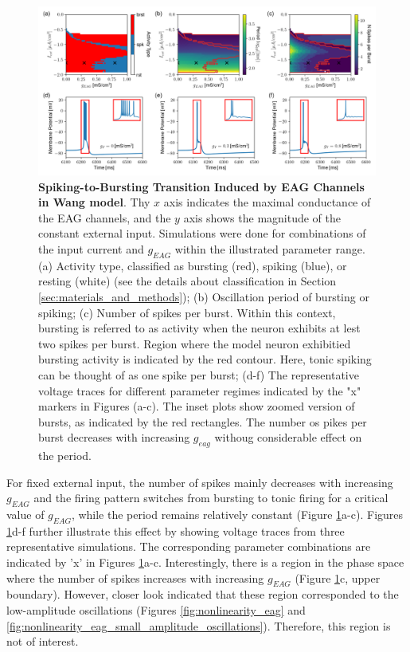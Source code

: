 \documentclass[../main.tex]{subfiles}
\begin{document}
\begin{figure}[!t]
    \centering
    \includegraphics[width=\linewidth]{../img/spiking_to_bursting/spiking_to_bursting.png}
    \caption[Spiking-to-Bursting Transition Induced by EAG Channels in Wang model]{
        \textbf{Spiking-to-Bursting Transition Induced by EAG Channels in Wang model}. 
        Thy $x$ axis indicates the maximal conductance of the EAG channels, and the $y$ axis shows the magnitude of the constant external input. Simulations were done for combinations of the input current and $g_{EAG}$ within the illustrated parameter range. (a) Activity type, classified as bursting (red), spiking (blue), or resting (white) (see the details about classification in Section \ref{sec:materials_and_methods}); (b) Oscillation period of bursting or spiking; (c) Number of spikes per burst. Within this context, bursting is referred to as activity when the neuron exhibits at lest two spikes per burst. Region where the model neuron exhibitied bursting activity is indicated by the red contour. Here, tonic spiking can be thought of as one spike per burst; (d-f) The representative voltage traces for different parameter regimes indicated by the "x" markers in Figures (a-c). The inset plots show zoomed version of bursts, as indicated by the red rectangles. The number os pikes per burst decreases with increasing $g_{eag}$ withoug considerable effect on the period.
    }
    \label{fig:spiking_to_bursting_wang_phase_diagram}
\end{figure}

For fixed external input, the number of spikes mainly decreases with increasing $g_{EAG}$ and the firing pattern switches from bursting to tonic firing for a critical value of $g_{EAG}$, while the period remains relatively constant (Figure \ref{fig:spiking_to_bursting_wang_phase_diagram}a-c).
Figures \ref{fig:spiking_to_bursting_wang_phase_diagram}d-f further illustrate this effect by showing voltage traces from three representative simulations. The corresponding parameter combinations are indicated by 'x' in Figures \ref{fig:spiking_to_bursting_wang_phase_diagram}a-c.
Interestingly, there is a region in the phase space where the number of spikes increases with increasing $g_{EAG}$ (Figure \ref{fig:spiking_to_bursting_wang_phase_diagram}c, upper boundary).
However, closer look indicated that these region corresponded to the low-amplitude oscillations (Figures \ref{fig:nonlinearity_eag} and \ref{fig:nonlinearity_eag_small_amplitude_oscillations}).
Therefore, this region is not of interest.
\end{document}
